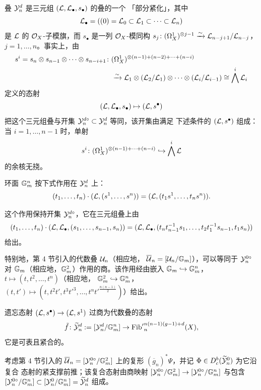 叠 $\mathcal{Y}^d_n$ 是三元组 $(\mathcal{L}, \mathcal{L}_\bullet, s_\bullet)$ 的叠的一个
「部分紧化」，其中
\[
  \mathcal{L}_\bullet = ((0) = \mathcal{L}_0 \subset \mathcal{L}_1 \subset \cdots \subset \mathcal{L}_n)
\]
是 $\mathcal{L}$ 的 $\mathcal{O}_X$-子模旗，而 $s_\bullet$ 是一列 $\mathcal{O}_X$-模同构
$s_j \colon (\Omega^{1}_{X})^{\otimes j-1} \xrightarrow{\sim} \mathcal{L}_{n-j+1}/\mathcal{L}_{n-j}$，
$j = 1, \dots, n$。事实上，由
\[
\begin{aligned}
  s^i = s_n \otimes s_{n-1} \otimes \cdots \otimes s_{n-i+1} \colon {}
  & (\Omega^{1}_{X})^{\otimes (n-1)+(n-2)+\cdots+(n-i)} \\
  & \xrightarrow{\sim}
  \mathcal{L}_1 \otimes (\mathcal{L}_2/\mathcal{L}_1) \otimes \cdots \otimes
  (\mathcal{L}_i/\mathcal{L}_{i-1}) \cong \bigwedge^i \mathcal{L}_i
\end{aligned}
\]
定义的态射
\[
  (\mathcal{L}, \mathcal{L}_\bullet, s_\bullet) \mapsto (\mathcal{L}, s^\bullet)
\]
把这个三元组叠与开集 $\mathcal{Y}^{d\circ}_n \subset \mathcal{Y}^d_n$ 等同，该开集由满足
下述条件的 $(\mathcal{L}, s^\bullet)$ 组成：当 $i = 1, \dots, n-1$ 时，单射
\[
  s^i \colon (\Omega^{1}_{X})^{\otimes (n-1)+\cdots+(n-i)} \hookrightarrow \bigwedge^i \mathcal{L}
\]
的余核无挠。

环面 $\mathbb{G}_m^n$ 按下式作用在 $\mathcal{Y}^d_n$ 上：
\[
  (t_1, \dots, t_n) \cdot (\mathcal{L}, (s^1, \dots, s^n)) =
  (\mathcal{L}, (t_1 s^1, \dots, t_n s^n)).
\]

这个作用保持开集 $\mathcal{Y}^{d\circ}_n$，它在三元组叠上由
\[
  (t_1, \dots, t_n) \cdot (\mathcal{L}, \mathcal{L}_\bullet, (s_1, \dots, s_{n-1}, s_n)) =
  (\mathcal{L}, \mathcal{L}_\bullet,
  (t_n t_{n-1}^{-1} s_1, \dots, t_2 t_1^{-1} s_{n-1}, t_1 s_n))
\]
给出。

特别地，第 4 节引入的代数叠 $\mathcal{U}_n$（相应地，
$\overline{\mathcal{U}}_n = [\mathcal{U}_n/\mathbb{G}_m]$），可以等同于
$\mathcal{Y}^{0\circ}_n$ 对 $\mathbb{G}_m$（相应地，$\mathbb{G}_m^2$）作用的商。该作用经由嵌入
$\mathbb{G}_m \hookrightarrow \mathbb{G}_m^n$，$t \mapsto (t, t^2, \dots, t^n)$（相应地，
$\mathbb{G}_m^2 \hookrightarrow \mathbb{G}_m^n$，
$(t, t') \mapsto (t, t^2t', t^3t'^3, \dots, t^n t'^{\frac{n(n-1)}{2}})$）给出。

\begin{proposition}[{[B-G]} 命题 1.2.2]
遗忘态射 $(\mathcal{L}, s^\bullet) \to (\mathcal{L}, s^1)$ 过商为代数叠的态射
\[
  \tilde{f} \colon \widetilde{\mathcal{Y}}^d_n := [\mathcal{Y}^d_n/\mathbb{G}_m^n]
  \to {\operatorname{Fib}'}^{n(n-1)(g-1)+d}_n(X),
\]
它是可表且紧合的。
\end{proposition}

考虑第 4 节引入的 $\overline{\mathcal{U}}_n = [\mathcal{Y}^{0\circ}_n/\mathbb{G}_m^2]$ 上的复形
$(\overline{g}_n)^*\Psi$，并记 $\Phi \in D^{b}_{c}(\widetilde{\mathcal{Y}}^0_n)$ 为它沿复合
态射的紧支撑前推；该复合态射由商映射
$[\mathcal{Y}^{0\circ}_n/\mathbb{G}_m^2] \to [\mathcal{Y}^{0\circ}_n/\mathbb{G}_m^n]$ 与包含
$[\mathcal{Y}^{0\circ}_n/\mathbb{G}_m^n] \subset [\mathcal{Y}^0_n/\mathbb{G}_m^n] =
\widetilde{\mathcal{Y}}^d_n$ 组成。


